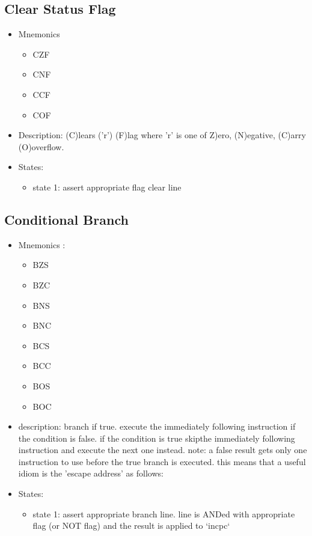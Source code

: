 \documentclass[a4paper,12pt]{article}
\begin{document}
\subsection{Clear Status Flag}
\begin{itemize}
\item Mnemonics 
\begin{itemize}
	\item CZF
	\item CNF
	\item CCF
	\item COF
\end{itemize}
\item Description: (C)lears ('r') (F)lag where 'r' is one of Z)ero, (N)egative, (C)arry (O)overflow.
\item States:
\begin{itemize}
	\item state 1: assert appropriate flag clear line
\end{itemize}
\end{itemize}

\subsection{Conditional Branch}
\begin{itemize}
\item Mnemonics :
\begin{itemize}
	\item BZS
	\item BZC
	\item BNS
	\item BNC
	\item BCS
	\item BCC
	\item BOS
	\item BOC
\end{itemize}
\item description: branch if true. execute the immediately following instruction if the condition is false. if the condition is true skipthe immediately following instruction and execute the next one instead. note: a false result gets only one instruction to use before the true branch is executed. this means that a useful idiom is the 'escape address' as follows:
\item States:
\begin{itemize}
	\item state 1: assert appropriate branch line. line is ANDed with appropriate flag (or NOT flag) and the result is applied to `incpc`
\end{itemize}
\end{itemize}
\end{document}
